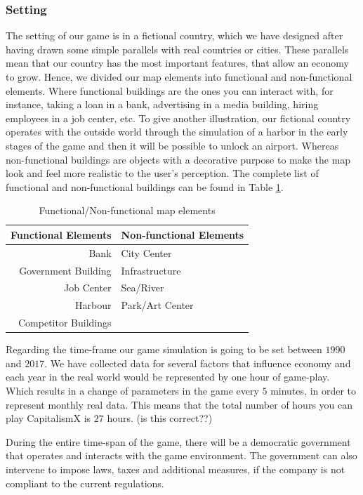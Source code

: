 \documentclass[11pt,titlepage,oneside,openany]{book}
\begin{document}
\subsubsection{Setting}
The setting of our game is in a fictional country, which we have designed after having drawn some simple parallels with real countries or cities. These parallels mean that our country has the most important features, that allow an economy to grow. Hence, we divided our map elements into functional and non-functional elements. Where functional buildings are the ones you can interact with, for instance, taking a loan in a bank, advertising in a media building, hiring employees in a job center, etc.  To give another illustration, our fictional country operates with the outside world through the simulation of a harbor in the early stages of the game and then it will be possible to unlock an airport. Whereas non-functional buildings are objects with a decorative purpose to make the map look and feel  more realistic to the user’s perception. The complete list of functional and non-functional buildings can be found in Table \ref{table:map-el}. 

\begin{table}[ht]
\centering
\begin{tabular}{r|l}
\hline 
 Functional Elements & Non-functional Elements\\
\hline \hline
 Bank & City Center  \\
 Government Building & Infrastructure \\
 Job Center & Sea/River \\
 Harbour & Park/Art Center  \\
 Competitor Buildings & \\
\hline
\end{tabular}
\caption{Functional/Non-functional map elements}
\label{table:map-el}
\end{table}


Regarding the time-frame our game simulation is going to be set between $1990$ and $2017$. We have collected data for several factors that influence economy and each year in the real world would be represented by one hour of game-play. Which results in a change of parameters in the game every $5$ minutes, in order to represent monthly real data. This means that the total number of hours you can play CapitalismX is $27$ hours. (is this correct??) 

During the entire time-span of the game, there will be a democratic government that operates and interacts with the game environment. The government can also intervene to impose laws, taxes and additional measures, if the company is not compliant to the current regulations. 
\end{document}
